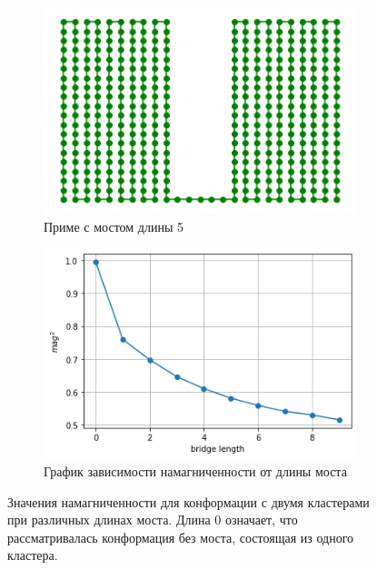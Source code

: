 \begin{figure}[h!]
	\centering
	\begin{subfigure}[t]{0.4\textwidth} 
		\includegraphics[width=\textwidth]{../images/2Cluster_conformation_short_link.png} 
		\caption{Приме с мостом длины 5}
	\end{subfigure} 
	\begin{subfigure}[t]{0.58\textwidth} 
		\includegraphics[width=\textwidth]{../images/mag2_from_bridge_length_in_two_clusters.png} 
		\caption{График зависимости намагниченности от длины моста}
	\end{subfigure} 
	\caption{Значения намагниченности для конформации с двумя кластерами при различных длинах моста. Длина 0 означает, что рассматривалась конформация без моста, состоящая из одного кластера.}
	\label{fig:mag_from_bridge_length}
\end{figure}

